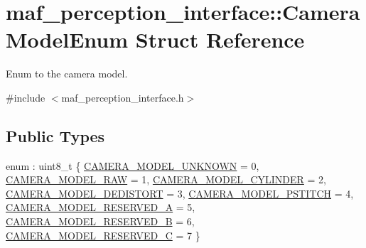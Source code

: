\hypertarget{structmaf__perception__interface_1_1CameraModelEnum}{}\section{maf\+\_\+perception\+\_\+interface\+:\+:Camera\+Model\+Enum Struct Reference}
\label{structmaf__perception__interface_1_1CameraModelEnum}


Enum to the camera model.  




{\ttfamily \#include $<$maf\+\_\+perception\+\_\+interface.\+h$>$}

\subsection*{Public Types}
\begin{DoxyCompactItemize}
\item 
enum \+: uint8\+\_\+t \{ \newline
\hyperlink{structmaf__perception__interface_1_1CameraModelEnum_accb12c2cef4137e477e891decfedcd54a4c086ce76879297b8681327778605cf8}{C\+A\+M\+E\+R\+A\+\_\+\+M\+O\+D\+E\+L\+\_\+\+U\+N\+K\+N\+O\+WN} = 0, 
\hyperlink{structmaf__perception__interface_1_1CameraModelEnum_accb12c2cef4137e477e891decfedcd54ade583dcc4aae217da384551ee7ff3da3}{C\+A\+M\+E\+R\+A\+\_\+\+M\+O\+D\+E\+L\+\_\+\+R\+AW} = 1, 
\hyperlink{structmaf__perception__interface_1_1CameraModelEnum_accb12c2cef4137e477e891decfedcd54af9b780f346e700ba57be96008b819bd8}{C\+A\+M\+E\+R\+A\+\_\+\+M\+O\+D\+E\+L\+\_\+\+C\+Y\+L\+I\+N\+D\+ER} = 2, 
\hyperlink{structmaf__perception__interface_1_1CameraModelEnum_accb12c2cef4137e477e891decfedcd54a5a68532bed94bd2b4dabc85af6acc0bc}{C\+A\+M\+E\+R\+A\+\_\+\+M\+O\+D\+E\+L\+\_\+\+D\+E\+D\+I\+S\+T\+O\+RT} = 3, 
\newline
\hyperlink{structmaf__perception__interface_1_1CameraModelEnum_accb12c2cef4137e477e891decfedcd54a7bf6573a26425a36895f117af84871bd}{C\+A\+M\+E\+R\+A\+\_\+\+M\+O\+D\+E\+L\+\_\+\+P\+S\+T\+I\+T\+CH} = 4, 
\hyperlink{structmaf__perception__interface_1_1CameraModelEnum_accb12c2cef4137e477e891decfedcd54a1bea31d770e2594573d2dcad666111ff}{C\+A\+M\+E\+R\+A\+\_\+\+M\+O\+D\+E\+L\+\_\+\+R\+E\+S\+E\+R\+V\+E\+D\+\_\+A} = 5, 
\hyperlink{structmaf__perception__interface_1_1CameraModelEnum_accb12c2cef4137e477e891decfedcd54ae48742721adab239a95afc584ad14bdd}{C\+A\+M\+E\+R\+A\+\_\+\+M\+O\+D\+E\+L\+\_\+\+R\+E\+S\+E\+R\+V\+E\+D\+\_\+B} = 6, 
\hyperlink{structmaf__perception__interface_1_1CameraModelEnum_accb12c2cef4137e477e891decfedcd54a7aa9da1202d10b8b448136aee0ccc953}{C\+A\+M\+E\+R\+A\+\_\+\+M\+O\+D\+E\+L\+\_\+\+R\+E\+S\+E\+R\+V\+E\+D\+\_\+C} = 7
 \}
\end{DoxyCompactItemize}
